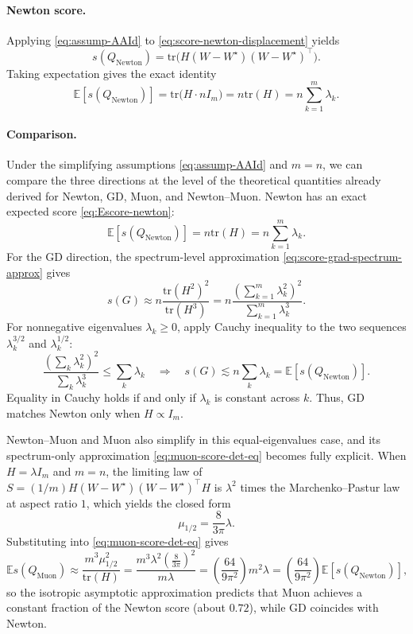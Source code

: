 \documentclass[11pt]{article}
\begin{document}
\paragraph{Newton score.}
Applying \eqref{eq:assump-AAId} to \eqref{eq:score-newton-displacement} yields
\[
  s ({Q}_{\mathrm{Newton}})
   = 
  \mathrm{tr} \Big({H} ({W}-W^\star)({W}-W^\star)^\top\Big).
\]
Taking expectation gives the exact identity
\begin{equation}
  \label{eq:Escore-newton}
  \mathbb{E} \left[s ({Q}_{\mathrm{Newton}})\right]
   = 
  \mathrm{tr} \Big({H}\cdot n{I}_m\Big)
   = 
  n \mathrm{tr}({H})
   = 
  n\sum_{k=1}^{m}\lambda_k.
\end{equation}

\paragraph{Comparison.}
Under the simplifying assumptions \eqref{eq:assump-AAId} and $m=n$, we can compare the three directions at the level of the
theoretical quantities already derived for Newton, GD, Muon, and Newton--Muon. Newton has an exact expected score
\eqref{eq:Escore-newton}:
\[
\mathbb{E} \left[s ({Q}_{\mathrm{Newton}})\right]
 = 
n \mathrm{tr}({H})
 = 
n\sum_{k=1}^{m}\lambda_k.
\]
For the GD direction, the spectrum-level approximation \eqref{eq:score-grad-spectrum-approx} gives
\[
s ({G})
 \approx 
n \frac{\mathrm{tr}({H}^2)^2}{\mathrm{tr}({H}^3)}
 = 
n \frac{\left(\sum_{k=1}^{m}\lambda_k^2\right)^2}{\sum_{k=1}^{m}\lambda_k^3}.
\]
For nonnegative eigenvalues $\lambda_k\ge 0$, apply Cauchy inequality to the two sequences $\lambda_k^{3/2}$ and $\lambda_k^{1/2}$:
\[
\frac{\left(\sum_k\lambda_k^2\right)^2}{\sum_k\lambda_k^3}
 \le 
\sum_k\lambda_k
\quad\Longrightarrow\quad
s ({G})
 \lesssim 
n\sum_k\lambda_k
=
\mathbb{E} \left[s ({Q}_{\mathrm{Newton}})\right].
\]
Equality in Cauchy holds if and only if $\lambda_k$ is constant across $k$. Thus, GD matches Newton only when ${H}\propto {I}_m$.

Newton--Muon and Muon also simplify in this equal-eigenvalues case, and its spectrum-only approximation \eqref{eq:muon-score-det-eq} becomes
fully explicit. When ${H}=\lambda {I}_m$ and $m=n$, the limiting law of
${S}=(1/m){H}({W}-W^\star)({W}-W^\star)^\top{H}$
is $\lambda^2$ times the Marchenko--Pastur law at aspect ratio $1$, which yields the closed form
\[
\mu_{1/2}
=
\frac{8}{3\pi}\lambda.
\]
Substituting into \eqref{eq:muon-score-det-eq} gives
\[
\mathbb{E} s ({Q}_{\mathrm{Muon}})
 \approx 
\frac{m^{3}\mu_{1/2}^{ 2}}{\mathrm{tr}({H})}
=
\frac{m^{3}\lambda^{2}\left(\frac{8}{3\pi}\right)^{ 2}}{m\lambda}
=
\left(\frac{64}{9\pi^2}\right)m^{2}\lambda
=
\left(\frac{64}{9\pi^2}\right)\mathbb{E} \left[s ({Q}_{\mathrm{Newton}})\right],
\]
so the isotropic asymptotic approximation predicts that Muon achieves a constant fraction of the Newton score (about $0.72$), while GD coincides with Newton.
\end{document}
